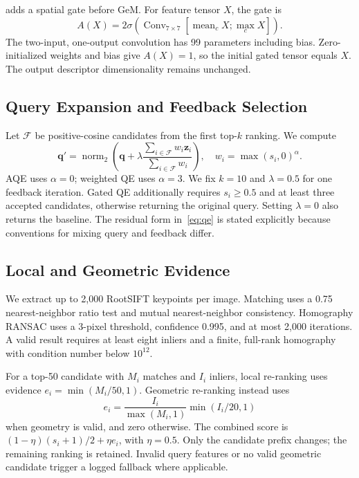 \Rtwo{} adds a spatial gate before GeM. For feature tensor $X$, the gate is
\begin{equation}
 A(X)=2\sigma\!\left(\operatorname{Conv}_{7\times7}
 [\operatorname{mean}_cX;\operatorname{max}_cX]\right).
\end{equation}
The two-input, one-output convolution has 99 parameters including bias. Zero-initialized weights and bias give $A(X)=1$, so the initial gated tensor equals $X$. The output descriptor dimensionality remains unchanged.

\subsection{Query Expansion and Feedback Selection}
Let $\mathcal F$ be positive-cosine candidates from the first top-$k$ ranking. We compute
\begin{equation}
 \mathbf q'=\operatorname{norm}_2\!\left(\mathbf q+
 \lambda\frac{\sum_{i\in\mathcal F}w_i\mathbf z_i}{\sum_{i\in\mathcal F}w_i}\right),
 \quad w_i=\max(s_i,0)^\alpha .
 \label{eq:qe}
\end{equation}
AQE uses $\alpha=0$; weighted QE uses $\alpha=3$. We fix $k=10$ and $\lambda=0.5$ for one feedback iteration. Gated QE additionally requires $s_i\geq0.5$ and at least three accepted candidates, otherwise returning the original query. Setting $\lambda=0$ also returns the baseline. The residual form in~\eqref{eq:qe} is stated explicitly because conventions for mixing query and feedback differ.

\subsection{Local and Geometric Evidence}
We extract up to 2,000 RootSIFT keypoints per image. Matching uses a 0.75 nearest-neighbor ratio test and mutual nearest-neighbor consistency. Homography RANSAC uses a 3-pixel threshold, confidence 0.995, and at most 2,000 iterations. A valid result requires at least eight inliers and a finite, full-rank homography with condition number below $10^{12}$.

For a top-50 candidate with $M_i$ matches and $I_i$ inliers, local re-ranking uses evidence $e_i=\min(M_i/50,1)$. Geometric re-ranking instead uses
\begin{equation}
 e_i=\frac{I_i}{\max(M_i,1)}\min(I_i/20,1)
\end{equation}
when geometry is valid, and zero otherwise. The combined score is $(1-\eta)(s_i+1)/2+\eta e_i$, with $\eta=0.5$. Only the candidate prefix changes; the remaining ranking is retained. Invalid query features or no valid geometric candidate trigger a logged fallback where applicable.

